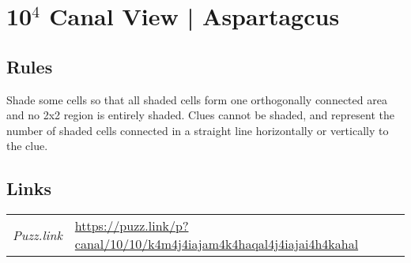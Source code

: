 \section[10$^4$ Canal View | Aspartagcus {[\emph{Canal View}]}]{10$^4$ Canal View | {\normalfont Aspartagcus}}
\label{sec:31-104-canal-view-aspartagcus}

\subsection*{Rules}
\begin{markdown}
Shade some cells so that all shaded cells form one orthogonally connected area and no 2x2 region is entirely shaded. Clues cannot be shaded, and represent the number of shaded cells connected in a straight line horizontally or vertically to the clue.
\end{markdown}
\subsection*{Links}
\begin{tabularx}{\textwidth}{l X}
\emph{Puzz.link} & \url{https://puzz.link/p?canal/10/10/k4m4j4iajam4k4haqal4j4iajai4h4kahal} \\
\end{tabularx}
\pagebreak
